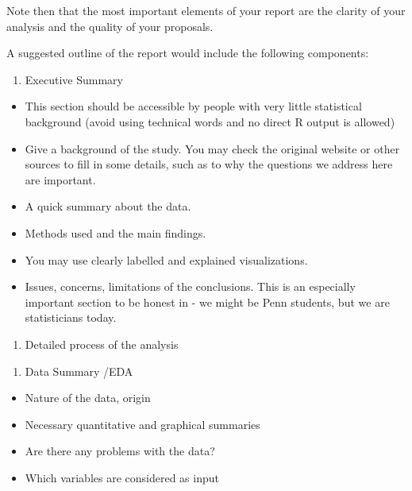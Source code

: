\documentclass[
]{article}
\providecommand{\tightlist}{%
  \setlength{\itemsep}{0pt}\setlength{\parskip}{0pt}}
\begin{document}
Note then that the most important elements of your report are the
clarity of your analysis and the quality of your proposals.

A suggested outline of the report would include the following
components:

\begin{enumerate}
\def\labelenumi{\arabic{enumi})}
\tightlist
\item
  Executive Summary
\end{enumerate}

\begin{itemize}
\tightlist
\item
  This section should be accessible by people with very little
  statistical background (avoid using technical words and no direct R
  output is allowed)
\item
  Give a background of the study. You may check the original website or
  other sources to fill in some details, such as to why the questions we
  address here are important.
\item
  A quick summary about the data.
\item
  Methods used and the main findings.
\item
  You may use clearly labelled and explained visualizations.
\item
  Issues, concerns, limitations of the conclusions. This is an
  especially important section to be honest in - we might be Penn
  students, but we are statisticians today.
\end{itemize}

\begin{enumerate}
\def\labelenumi{\arabic{enumi})}
\setcounter{enumi}{1}
\tightlist
\item
  Detailed process of the analysis
\end{enumerate}

\begin{enumerate}
\def\labelenumi{\roman{enumi})}
\tightlist
\item
  Data Summary /EDA
\end{enumerate}

\begin{itemize}
\tightlist
\item
  Nature of the data, origin
\item
  Necessary quantitative and graphical summaries
\item
  Are there any problems with the data?
\item
  Which variables are considered as input
\end{itemize}
\end{document}
